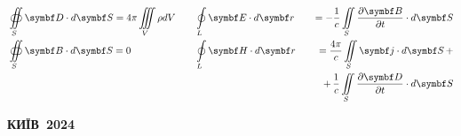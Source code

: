 {\begin{alwayssingle}
\begin{center}
\begin{tcolorbox}
			]
			\centering
			\Huge\sffamily\bfseries\textcolor{white}{\realtitle}\\
			\huge\sffamily\bfseries\textcolor{white}{\subtitle}
			\end{tcolorbox}
			\vfill
		 	\begin{Large}\color{themecolordark!90!black}
			\begin{alignat*}{4}
					&\oiint\limits_S \Dfield\cdot d\vect{S} = 4\pi\iiint\limits_V\rho dV  \quad
					&&\oint\limits_L \Efield\cdot d\vect{r} &&&= - \frac1c \iint\limits_S \frac{\partial\Bfield}{\partial t}\cdot d\vect{S} \\
					&\oiint\limits_S \Bfield\cdot d\vect{S} = 0
					 \quad
					&&\oint\limits_L \Hfield\cdot d\vect{r} &&& =\dfrac{4\pi}{c} \iint\limits_S \vect{j}\cdot d\vect{S} \,+ \\
					& && &&& +\,\frac{1}{c} \iint\limits_S  \frac{\partial\Dfield}{\partial t}\cdot d\vect{S}
			\end{alignat*}
			\end{Large}
			\vfill
			\begin{tcolorbox}[titlepagestyle,
					toprule=0.10cm,
					bottomrule=0.10cm]
				\begin{center}\color{white}\bfseries\normalsize
					\MakeUppercase{Київ~2024} \\
				\end{center}
			\end{tcolorbox}
		\end{center}
		\clearpage
	\end{alwayssingle}
\setcounter{page}{1}
}


%
%

